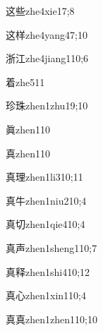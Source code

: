 \begin{verbete}{这些}{zhe4xie1}{7;8}
\end{verbete}
\begin{verbete}{这样}{zhe4yang4}{7;10}
\end{verbete}
\begin{verbete}{浙江}{zhe4jiang1}{10;6}
\end{verbete}
\begin{verbete}{着}{zhe5}{11}
\end{verbete}
\begin{verbete}{珍珠}{zhen1zhu1}{9;10}
\end{verbete}
\begin{verbete}{眞}{zhen1}{10}
\end{verbete}
\begin{verbete}{真}{zhen1}{10}
\end{verbete}
\begin{verbete}{真理}{zhen1li3}{10;11}
\end{verbete}
\begin{verbete}{真牛}{zhen1niu2}{10;4}
\end{verbete}
\begin{verbete}{真切}{zhen1qie4}{10;4}
\end{verbete}
\begin{verbete}{真声}{zhen1sheng1}{10;7}
\end{verbete}
\begin{verbete}{真释}{zhen1shi4}{10;12}
\end{verbete}
\begin{verbete}{真心}{zhen1xin1}{10;4}
\end{verbete}
\begin{verbete}{真真}{zhen1zhen1}{10;10}
\end{verbete}
